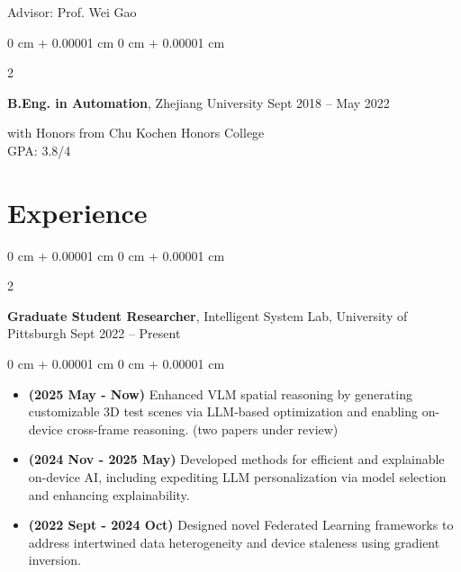 \documentclass[10pt, letterpaper]{article}
\newenvironment{highlights}{
    \begin{itemize}[
        topsep=0.10 cm,
        parsep=0.10 cm,
        partopsep=0pt,
        itemsep=0pt,
        leftmargin=0 cm + 10pt
    ]
}{
    \end{itemize}
} %
\newenvironment{onecolentry}{
    \begin{adjustwidth}{
        0 cm + 0.00001 cm
    }{
        0 cm + 0.00001 cm
    }
}{
    \end{adjustwidth}
} %
\newenvironment{twocolentry}[2][]{
    \onecolentry
    \def\secondColumn{#2}
    \setcolumnwidth{\fill, 4.5 cm}
    \begin{paracol}{2}
}{
    \switchcolumn \raggedleft \secondColumn
    \end{paracol}
    \endonecolentry
} %
\begin{document}
        \vspace{-0.1 cm}
        {Advisor: Prof. Wei Gao}
        \vspace{0.2 cm}
        \begin{twocolentry}{
            Sept 2018 – May 2022 
        }
            \textbf{B.Eng. in Automation}, Zhejiang University\end{twocolentry}
    
        \vspace{0.05 cm}
        {with Honors from Chu Kochen Honors College\\}
        {GPA: 3.8/4}

    
    \section{Experience}

        \begin{twocolentry}{
            Sept 2022 – Present
        }
            \textbf{Graduate Student Researcher}, Intelligent System Lab, University of Pittsburgh\end{twocolentry}

        \vspace{0.10 cm}
        \begin{onecolentry}
            \begin{highlights}
                \item \textbf{(2025 May - Now)} Enhanced VLM spatial reasoning by generating customizable 3D test scenes via LLM-based optimization and enabling on-device cross-frame reasoning. (two papers under review)
            
                \item \textbf{(2024 Nov - 2025 May)} Developed methods for efficient and explainable on-device AI, including expediting LLM personalization via model selection and enhancing explainability.

                \item \textbf{(2022 Sept - 2024 Oct)} Designed novel Federated Learning frameworks to address intertwined data heterogeneity and device staleness using gradient inversion.
                
            \end{highlights}
        \end{onecolentry}
\end{document}
